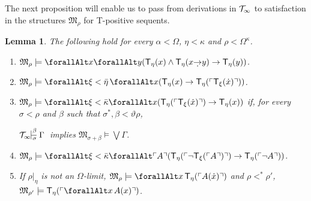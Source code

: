 \documentclass[UKenglish,cleveref,DIV=12]{scrartcl}
\let\forall\forallAlt
\newtheorem{lemma}{Lemma}
\theoremstyle{definition}
\theoremstyle{definition}
\begin{document}
The next proposition will enable us to pass from derivations in $\mathcal{T}_\infty$ to satisfaction in the structures $\mathfrak
M_{\rho}$ for T-positive sequents.
\begin{lemma}\label{extlem:T8Mprop}
 The following hold for every $\alpha<\Omega$, $\eta<\kappa$ and $\rho<\Omega^\kappa$.
 \begin{enumerate}
  \item $\mathfrak M_\rho\models\forall x\forall y( \T_\eta(x)\land
	\T_\eta(x\dimplies y) \rightarrow \T_\eta(y))$.\label{exteqn:T8propii}
  \item $\mathfrak M_\rho\models \forall \xi<\bar\eta\,\forall
	x(\T_\eta(x)\rightarrow \T_\eta(\gn{\T_\xi(\dot x)}))$.\label{exteqn:T8propiii}
  \item $\mathfrak M_\rho\models\forall\xi<\bar\kappa\forall
	x(\T_\eta(\gn{\T_{\xi}(\dot x)})\rightarrow \T_\eta(x))$ if, for every
	$\sigma<\rho$ and $\beta$ such that $\sigma^*,\beta<\vartheta\rho$,
	\begin{center}
	  $\Tinfty\prov\beta\sigma\Gamma$ implies $\mathfrak M_{\sigma+\beta}\models\textstyle\bigvee\Gamma$.
	\end{center}\label{exteqn:T8propiv}
  \item $\mathfrak M_\rho\models\forall\xi<\bar\kappa\forall \gn A(\T_\eta(\gn{\lnot \T_{\xi}(\gn A)})\rightarrow \T_\eta(\gn{\lnot A}))$.\label{exteqn:T8propv}
  \item If $\rho|_\eta$ is not an $\Omega$-limit, $\mathfrak M_\rho\models
	\forall x\,\T_\eta(\gn{A(\dot x)})$ and $\rho<^*\rho'$, $\mathfrak M_{\rho'}\models \T_\eta(\gn{\forall x\,A(x)})$.\label{exteqn:T8propvi}
 \end{enumerate}
\end{lemma}
\end{document}
